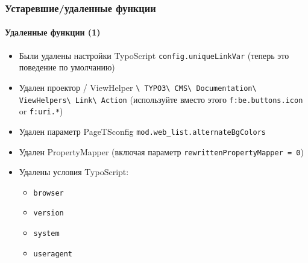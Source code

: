 \begin{frame}[fragile]
	\frametitle{Устаревшие/удаленные функции}
	\framesubtitle{Удаленные функции (1)}

	\begin{itemize}

		\item
			\small
				Были удалены настройки TypoScript \texttt{config.uniqueLinkVar}\newline
				(теперь это поведение по умолчанию)
			\normalsize

		\item
			\small
				Удален проектор / ViewHelper
					\texttt{\textbackslash
						TYPO3\textbackslash
						CMS\textbackslash
						Documentation\textbackslash
						ViewHelpers\textbackslash
						Link\textbackslash
						Action}
				 (используйте вместо этого \texttt{f:be.buttons.icon} or \texttt{f:uri.*})
			\normalsize

		\item
			\small
				Удален параметр PageTSconfig \texttt{mod.web\_list.alternateBgColors}\newline
			\normalsize

		\item
			\small
				Удален PropertyMapper\newline
				(включая параметр \texttt{rewrittenPropertyMapper = 0})
			\normalsize

		\item
			\small
				Удалены условия TypoScript:

					\begin{itemize}
						\item\texttt{browser}
						\item\texttt{version}
						\item\texttt{system}
						\item\texttt{useragent}
					\end{itemize}
			\normalsize

	\end{itemize}

\end{frame}


